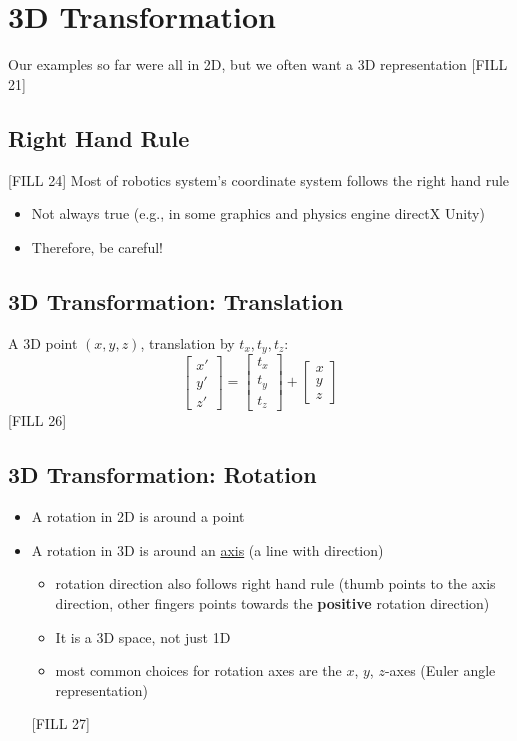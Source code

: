 \documentclass[10pt]{article}
\begin{document}
\section*{3D Transformation}
Our examples so far were all in 2D, but we often want a 3D representation
[FILL 21]

\subsection*{Right Hand Rule}
[FILL 24]
Most of robotics system's coordinate system follows the right hand rule
\begin{itemize}
	\item Not always true (e.g., in some graphics and physics engine directX Unity)
	\item Therefore, be careful!
\end{itemize}

\subsection*{3D Transformation: Translation}
A 3D point $(x, y, z)$, translation by $t_x, t_y, t_z$:
\[\begin{bmatrix} x' \\ y' \\ z' \end{bmatrix} = \begin{bmatrix} t_x \\ t_y \\ t_z \end{bmatrix} + \begin{bmatrix} x \\ y \\ z \end{bmatrix}\]
[FILL 26]

\subsection*{3D Transformation: Rotation}
\begin{itemize}
	\item A rotation in 2D is around a point
	\item A rotation in 3D is around an \underline{axis} (a line with direction)
	\begin{itemize}
        \item rotation direction also follows right hand rule (thumb points to the axis direction, other fingers points towards the \textbf{positive} rotation direction)
        \item It is a 3D space, not just 1D
        \item most common choices for rotation axes are the $x$, $y$, $z$-axes (Euler angle representation)
    \end{itemize}
    [FILL 27]
\end{itemize}
\end{document}

